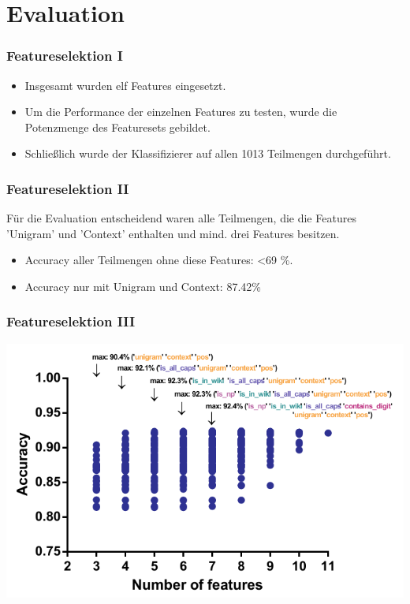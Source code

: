 \documentclass{beamer}
\begin{document}
\section{Evaluation}
	\begin{frame}
		\frametitle{Featureselektion I}
		\begin{itemize}
			\item <+->Insgesamt wurden elf Features eingesetzt.\\
			
			\item <+->Um die Performance der einzelnen Features zu testen, wurde die Potenzmenge des Featuresets gebildet.\\
			
			\item <+->Schließlich wurde der Klassifizierer auf allen 1013 Teilmengen durchgeführt.\\
		\end{itemize}
		
	\end{frame}
	\begin{frame}
		\frametitle{Featureselektion II}
			Für die Evaluation entscheidend waren alle Teilmengen, die die Features 'Unigram' und 'Context' enthalten und mind. drei Features besitzen.\\
					
			\begin{itemize}
				\item Accuracy aller Teilmengen ohne diese Features: \textless 69 \%.
				\item Accuracy nur mit Unigram und Context: 87.42\%
			\end{itemize}

					
	\end{frame}
		\begin{frame}
			\frametitle{Featureselektion III}
			\includegraphics[scale=0.9]{accuracy.pdf}\\

		\end{frame}
\end{document}

